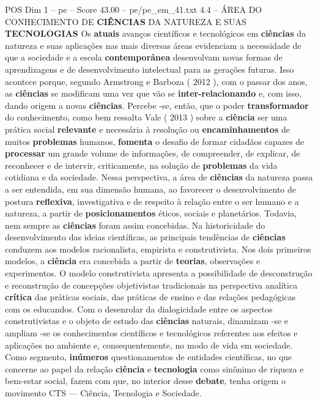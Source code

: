 \begin{textsample}{POS Dim 1 – pe – Score 43.00 – pe/pe\_em\_41.txt}  \label{ex:f1_pos_243}
4.4 – ÁREA DO CONHECIMENTO DE \textbf{CIÊNCIAS} DA NATUREZA E SUAS \textbf{TECNOLOGIAS} Os \textbf{atuais} avanços científicos e tecnológicos em \textbf{ciências} da natureza e suas aplicações nas mais diversas áreas evidenciam a necessidade de que a sociedade e a escola \textbf{contemporânea} desenvolvam novas formas de aprendizagens e de desenvolvimento intelectual para as gerações futuras.
Isso acontece porque, segundo Armstrong e Barboza ( 2012 ), com o passar dos anos, as \textbf{ciências} se modificam uma vez que vão se \textbf{inter-relacionando} e, com isso, dando origem a novas \textbf{ciências}.
Percebe -se, então, que o poder \textbf{transformador} do conhecimento, como bem ressalta Vale ( 2013 ) sobre a \textbf{ciência} ser uma prática social \textbf{relevante} e necessária à resolução ou \textbf{encaminhamentos} de muitos \textbf{problemas} humanos, \textbf{fomenta} o desafio de formar cidadãos capazes de \textbf{processar} um grande volume de informações, de compreender, de explicar, de reconhecer e de intervir, criticamente, na solução de \textbf{problemas} da vida cotidiana e da sociedade.
Nessa perspectiva, a área de \textbf{ciências} da natureza passa a ser entendida, em sua dimensão humana, ao favorecer o desenvolvimento de postura \textbf{reflexiva}, investigativa e de respeito à relação entre o ser humano e a natureza, a partir de \textbf{posicionamentos} éticos, sociais e planetários.
Todavia, nem sempre as \textbf{ciências} foram assim concebidas.
Na historicidade do desenvolvimento das ideias científicas, as principais tendências de \textbf{ciências} conduzem aos modelos racionalista, empirista e construtivista.
Nos dois primeiros modelos, a \textbf{ciência} era concebida a partir de \textbf{teorias}, observações e experimentos.
O modelo construtivista apresenta a possibilidade de desconstrução e reconstrução de concepções objetivistas tradicionais na perspectiva analítica \textbf{crítica} das práticas sociais, das práticas de ensino e das relações pedagógicas com os educandos.
Com o desenrolar da dialogicidade entre os aspectos construtivistas e o objeto de estudo das \textbf{ciências} naturais, dinamizam -se e ampliam -se os conhecimentos científicos e tecnológicos referentes aos efeitos e aplicações no ambiente e, consequentemente, no modo de vida em sociedade.
Como segmento, \textbf{inúmeros} questionamentos de entidades científicas, no que concerne ao papel da relação \textbf{ciência} e \textbf{tecnologia} como sinônimo de riqueza e bem-estar social, fazem com que, no interior desse \textbf{debate}, tenha origem o movimento CTS — Ciência, Tecnologia e Sociedade.

\end{textsample}
